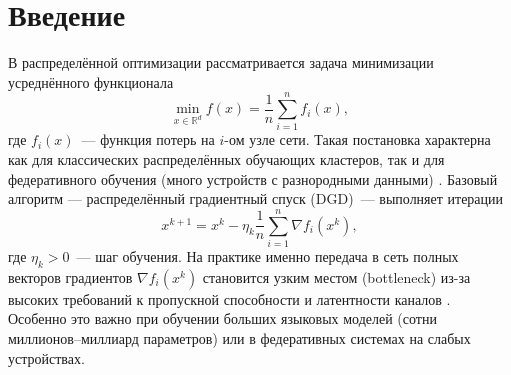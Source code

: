 \section{Введение}

    В распределённой оптимизации рассматривается задача минимизации усреднённого функционала
    \begin{equation}
        \min_{x\in\mathbb{R}^d} f(x) = \frac{1}{n}\sum_{i=1}^n f_i(x),
    \end{equation}
    где $f_i(x)$~--- функция потерь на $i$-ом узле сети. Такая постановка характерна как для классических распределённых обучающих кластеров, так и для федеративного обучения (много устройств с разнородными данными) \cite{beznosikov2024biasedcompressiondistributedlearning}. Базовый алгоритм — распределённый градиентный спуск (DGD)~--- выполняет итерации
    \begin{equation}\label{eq:dgd}
        x^{k + 1} = x^k - \eta_k \frac{1}{n}\sum_{i=1}^n \nabla f_i(x^k),
    \end{equation}
    где $\eta_k > 0$~--- шаг обучения. На практике именно передача в сеть полных векторов градиентов $\nabla f_i(x^k)$ становится узким местом (bottleneck) из-за высоких требований к пропускной способности и латентности каналов \cite{beznosikov2024biasedcompressiondistributedlearning}. Особенно это важно при обучении больших языковых моделей (сотни миллионов–миллиард параметров) или в федеративных системах на слабых устройствах.


